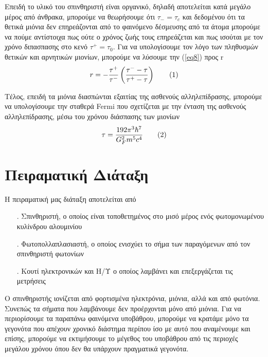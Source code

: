 \documentclass[a4paper]{book}
\newcommand\numberthis{\addtocounter{equation}{1}\tag{\theequation}}
\begin{document}
		Επειδή το υλικό του σπινθηριστή είναι οργανικό, δηλαδή αποτελείται κατά μεγάλο μέρος από άνθρακα, μπορούμε να θεωρήσουμε ότι $\tau_-=\tau_c$ και δεδομένου ότι τα θετικά μιόνια δεν επηρεάζονται από το φαινόμενο δέσμευσης από τα άτομα μπορούμε να πούμε αντίστοιχα πως ούτε ο χρόνος ζωής τους επηρεάζεται και πως ισούται με τον χρόνο διπασπασης στο κενό $\tau^+= \tau_0$.
		Για να υπολογίσουμε τον λόγο των πληθυσμών θετικών και αρνητικών μιονίων, μπορούμε να λύσουμε την (\ref{eq8}) προς r 
		\begin{align*}\label{eq9}
			r =- \frac{\tau^+}{\tau^-}\left( \frac{\tau^- -\tau}{\tau^+ - \tau}\right)\numberthis
		\end{align*}
	
	Τέλος, επειδή τα μιόνια διασπώνται εξαιτίας της ασθενούς αλληλεπίδρασης, μπορούμε να υπολογίσουμε την σταθερά Fermi που σχετίζεται με την ένταση της ασθενούς αλληλεπίδρασης, μέσω του χρόνου διάσπασης των μιονίων 
	\begin{align*}\label{eq10}
		\tau = \frac{192\pi^3\hbar^7}{G_F ^2m^5c^4} \numberthis
	\end{align*}
	
\section*{Πειραματική Διάταξη}


	Η πειραματική μας διάταξη αποτελείται από 
		\begin{itemize}
			\item[.] Σπινθηριστή, ο οποίος είναι τοποθετημένος στο μισό μέρος ενός φωτομονωμένου κυλίνδρου αλουμινίου
			\item[.] Φωτοπολλαπλασιαστή, ο οποίος ενισχύει το σήμα των παραγόμενων από τον σπινθηριστή φωτονίων
			\item[.] Κουτί ηλεκτρονικών και Η/Υ ο οποίος λαμβάνει και επεξεργάζεται τις μετρήσεις
		\end{itemize}
		
	Ο σπινθηριστής ιονίζεται από φορτισμένα ηλεκτρόνια, μιόνια, αλλά και από φωτόνια. Συνεπώς τα σήματα που λαμβάνουμε δεν προέρχονται μόνο από μιόνια. Για να περιορίσουμε τα παραπάνω φαινόμενα υποβάθρου, μπορούμε να κρατάμε μόνο τα γεγονότα που απέχουν χρονικό διάστημα περίπου ίσο με αυτό που αναμένουμε και επίσης, μπορούμε να εκτιμήσουμε το μέγεθος του υποβάθρου από τις περιοχές μεγάλου χρόνου όπου δεν θα υπάρχουν πραγματικά γεγονότα.
	
\end{document}
